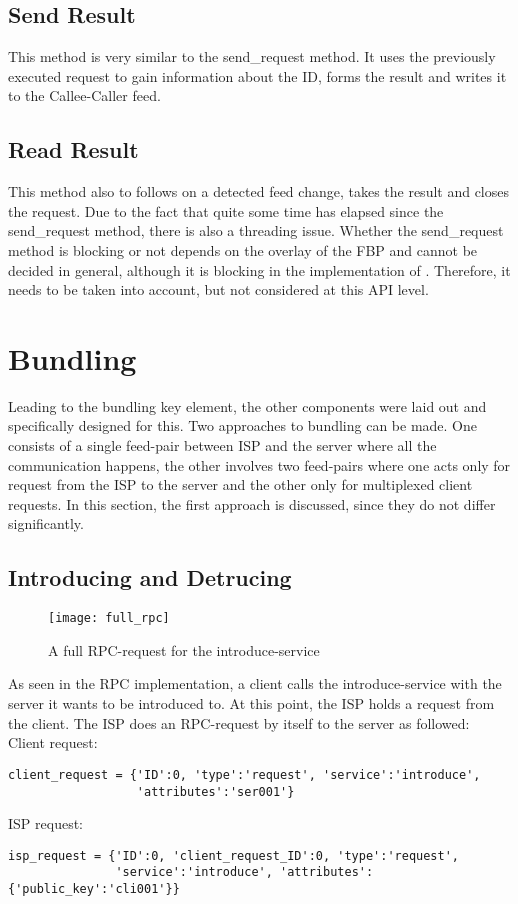 \subsection{Send Result}

This method is very similar to the send\_request method. It uses the previously executed request to gain information about the ID, forms the result and writes it to the Callee-Caller feed.
\subsection{Read Result}

This method also to follows on a detected feed change, takes the result and closes the request. Due to the fact that quite some time has elapsed since the send\_request method, there is also a threading issue. Whether the send\_request method is blocking or not depends on the overlay of the FBP and cannot be decided in general, although it is blocking in the implementation of \citet{birrell1984implementing}. Therefore, it needs to be taken into account, but not considered at this API level.

\section{Bundling}
Leading to the bundling key element, the other components were laid out and specifically designed for this. Two approaches to bundling can be made. One consists of a single feed-pair between ISP and the server where all the communication happens, the other involves two feed-pairs where one acts only for request from the ISP to the server and the other only for multiplexed client requests. In this section, the first approach is discussed, since they do not differ significantly.
\subsection{Introducing and Detrucing}
\begin{figure}
    \centering
    \texttt{[image: full\_rpc]}
    \caption{A full RPC-request for the introduce-service}
    \label{fig:fullprc}
\end{figure}

As seen in the RPC implementation, a client calls the introduce-service with the server it wants to be introduced to. At this point, the ISP holds a request from the client. The ISP does an RPC-request by itself to the server as followed:
\\
Client request: \begin{lstlisting}
client_request = {'ID':0, 'type':'request', 'service':'introduce', 
                  'attributes':'ser001'}
\end{lstlisting}
ISP request: 
\begin{lstlisting}
isp_request = {'ID':0, 'client_request_ID':0, 'type':'request', 
               'service':'introduce', 'attributes':{'public_key':'cli001'}}
\end{lstlisting}


